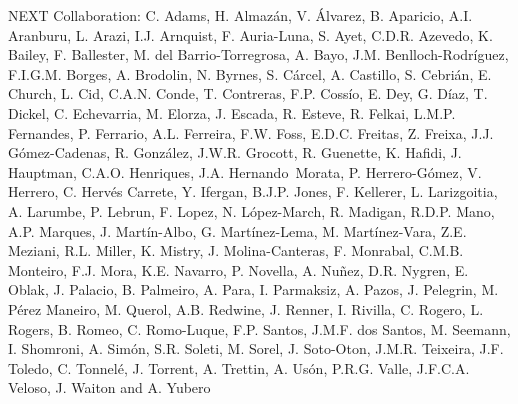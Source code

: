 NEXT Collaboration: C. Adams, H. Almaz\'an, V. \'Alvarez, B. Aparicio, A.I. Aranburu, L. Arazi, I.J. Arnquist, F. Auria-Luna, S. Ayet, C.D.R. Azevedo, K. Bailey, F. Ballester, M. del Barrio-Torregrosa, A. Bayo, J.M. Benlloch-Rodr\'{i}guez, F.I.G.M. Borges, A. Brodolin, N. Byrnes, S. C\'arcel, A. Castillo, S. Cebri\'an, E. Church, L. Cid, C.A.N. Conde, T. Contreras, F.P. Coss\'io, E. Dey, G. D\'iaz, T. Dickel, C. Echevarria, M. Elorza, J. Escada, R. Esteve, R. Felkai, L.M.P. Fernandes, P. Ferrario, A.L. Ferreira, F.W. Foss, E.D.C. Freitas, Z. Freixa, J.J. G\'omez-Cadenas, R. Gonz\'alez, J.W.R. Grocott, R. Guenette, K. Hafidi, J. Hauptman, C.A.O. Henriques, J.A. Hernando~Morata, P. Herrero-G\'omez, V. Herrero, C. Herv\'es Carrete, Y. Ifergan, B.J.P. Jones, F. Kellerer, L. Larizgoitia, A. Larumbe, P. Lebrun, F. Lopez, N. L\'opez-March, R. Madigan, R.D.P. Mano, A.P. Marques, J. Mart\'in-Albo, G. Mart\'inez-Lema, M. Mart\'inez-Vara, Z.E. Meziani, R.L. Miller, K. Mistry, J. Molina-Canteras, F. Monrabal, C.M.B. Monteiro, F.J. Mora, K.E. Navarro, P. Novella, A. Nu\~{n}ez, D.R. Nygren, E. Oblak, J. Palacio, B. Palmeiro, A. Para, I. Parmaksiz, A. Pazos, J. Pelegrin, M. P\'erez Maneiro, M. Querol, A.B. Redwine, J. Renner, I. Rivilla, C. Rogero, L. Rogers, B. Romeo, C. Romo-Luque, F.P. Santos, J.M.F. dos Santos, M. Seemann, I. Shomroni, A. Sim\'on, S.R. Soleti, M. Sorel, J. Soto-Oton, J.M.R. Teixeira, J.F. Toledo, C. Tonnel\'e, J. Torrent, A. Trettin, A. Us\'on, P.R.G. Valle, J.F.C.A. Veloso, J. Waiton and A. Yubero